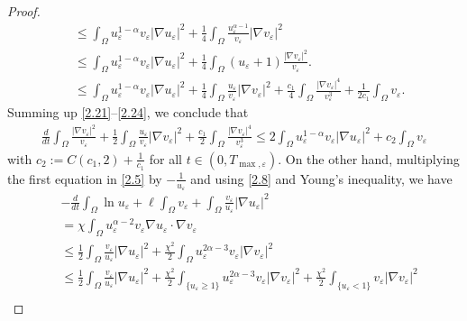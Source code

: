 \documentclass[12pt]{article}
\theoremstyle{plain}
\theoremstyle{definition}
\numberwithin{equation}{section}
\begin{document}
\begin{proof}
\begin{align}
&\leq \int_{\Omega}u_{\varepsilon}^{1-\alpha}v_{\varepsilon}|\nabla u_{\varepsilon }|^2
+\frac{1}{4}\int_{\Omega} \frac{u_{\varepsilon}^{\alpha-1}}{v_{\varepsilon}} |\nabla v_{\varepsilon }|^2\nonumber\\
&\leq \int_{\Omega}u_{\varepsilon}^{1-\alpha}v_{\varepsilon}|\nabla u_{\varepsilon }|^2
+\frac{1}{4}\int_{\Omega} \left(u_{\varepsilon}+1\right)\frac{|\nabla v_{\varepsilon }|^2}{v_{\varepsilon}}.\nonumber\\
&\leq  \int_{\Omega}u_{\varepsilon}^{1-\alpha}v_{\varepsilon}|\nabla u_{\varepsilon }|^2
+\frac{1}{4}\int_{\Omega} \frac{u_{\varepsilon}}{v_{\varepsilon}}|\nabla v_{\varepsilon }|^2+\frac{c_1}{4}\int_{\Omega} \frac{|\nabla v_{\varepsilon }|^4}{v_{\varepsilon}^3}+ \frac{1}{2c_1} \int_{\Omega} v_{\varepsilon}.
\end{align}
Summing up \eqref{2.21}--\eqref{2.24}, we conclude that
\begin{align}\label{2.25}
\frac{d}{dt}\int_{\Omega} \frac{|\nabla v_{\varepsilon}|^2}{v_{\varepsilon}}
+\frac{1}{2} \int_{\Omega} \frac{u_{\varepsilon}}{v_{\varepsilon}} |\nabla v_{\varepsilon }|^2+\frac{c_1}{2}\int_{\Omega} \frac{|\nabla v_{\varepsilon }|^4}{v_{\varepsilon}^3}
\leq  2 \int_{\Omega}u_{\varepsilon}^{1-\alpha}v_{\varepsilon}|\nabla u_{\varepsilon }|^2
+c_2 \int_{\Omega} v_{\varepsilon}
\end{align}
with $ c_2 :=C(c_1,2)+\frac{1}{c_1}$ for all $t \in(0, T_{\max, \varepsilon})$. On the other hand, multiplying the first equation in \eqref{2.5} by $-\frac{1}{u_{\varepsilon}}$ and using \eqref{2.8} and Young's inequality, we have
\begin{align}\label{2.26}
&-\frac{d}{dt}\int_{\Omega}\ln{u_{\varepsilon}}+\ell \int_{\Omega} v_{\varepsilon}+\int_{\Omega} \frac{v_{\varepsilon}}{u_{\varepsilon}} |\nabla u_{\varepsilon }|^2\nonumber\\
&=\chi \int_{\Omega}u_{\varepsilon}^{\alpha-2}v_{\varepsilon}\nabla u_{\varepsilon}\cdot \nabla v_{\varepsilon}\nonumber\\
&\leq \frac{1}{2}\int_{\Omega} \frac{v_{\varepsilon}}{u_{\varepsilon}} |\nabla u_{\varepsilon }|^2 +\frac{\chi^2}{2}\int_{\Omega} u_{\varepsilon}^{2\alpha-3}v_{\varepsilon} |\nabla v_{\varepsilon }|^2\nonumber\\
 &\leq\frac{1}{2}\int_{\Omega} \frac{v_{\varepsilon}}{u_{\varepsilon}} |\nabla u_{\varepsilon }|^2 +\frac{\chi^2}{2}\int_{\{u_{\varepsilon}\geq 1\}} u_{\varepsilon}^{2\alpha-3}v_{\varepsilon} |\nabla v_{\varepsilon }|^2+\frac{\chi^2}{2}\int_{\{u_{\varepsilon}<1\}} v_{\varepsilon} |\nabla v_{\varepsilon }|^2\nonumber\\

\end{align}
\end{proof}
\end{document}
